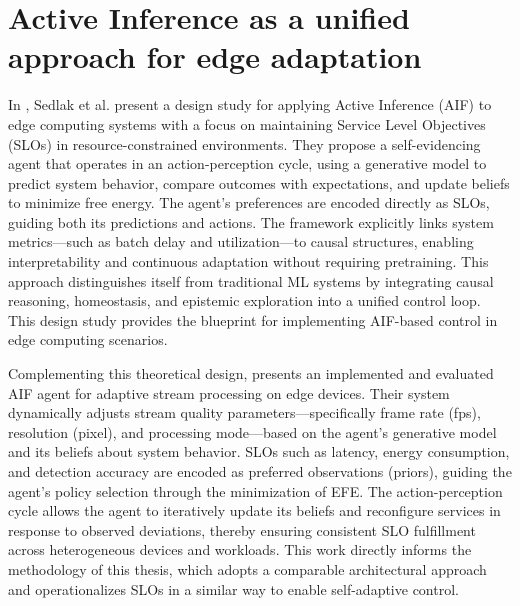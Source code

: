 \section{Active Inference as a unified approach for edge adaptation}
In \cite{sedlak_active_2024}, Sedlak et al. present a design study for applying Active Inference (AIF) to edge computing systems with a focus on maintaining Service Level Objectives (SLOs) in resource-constrained environments. They propose a self-evidencing agent that operates in an action-perception cycle, using a generative model to predict system behavior, compare outcomes with expectations, and update beliefs to minimize free energy. The agent’s preferences are encoded directly as SLOs, guiding both its predictions and actions. The framework explicitly links system metrics—such as batch delay and utilization—to causal structures, enabling interpretability and continuous adaptation without requiring pretraining. This approach distinguishes itself from traditional ML systems by integrating causal reasoning, homeostasis, and epistemic exploration into a unified control loop. This design study provides the blueprint for implementing AIF-based control in edge computing scenarios.

Complementing this theoretical design, \cite{sedlak_adaptive_2024} presents an implemented and evaluated AIF agent for adaptive stream processing on edge devices. Their system dynamically adjusts stream quality parameters—specifically frame rate (fps), resolution (pixel), and processing mode—based on the agent’s generative model and its beliefs about system behavior. SLOs such as latency, energy consumption, and detection accuracy are encoded as preferred observations (priors), guiding the agent’s policy selection through the minimization of EFE. The action-perception cycle allows the agent to iteratively update its beliefs and reconfigure services in response to observed deviations, thereby ensuring consistent SLO fulfillment across heterogeneous devices and workloads. This work directly informs the methodology of this thesis, which adopts a comparable architectural approach and operationalizes SLOs in a similar way to enable self-adaptive control.


